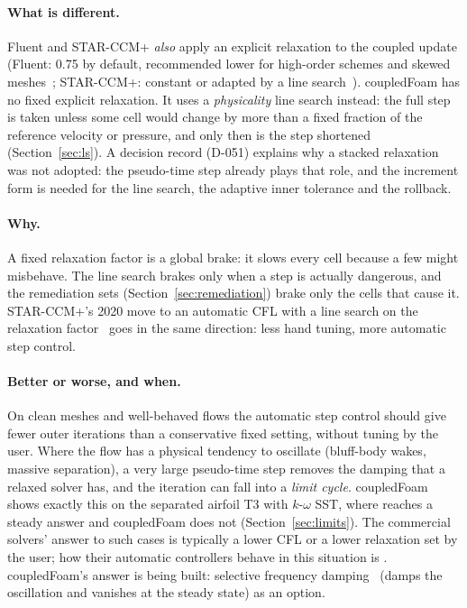 \paragraph{What is different.} Fluent and STAR-CCM+ \emph{also} apply an
explicit relaxation to the coupled update (Fluent: 0.75 by default,
recommended lower for high-order schemes and skewed
meshes~\cite{cmp-Fluent12UG}; STAR-CCM+: constant or adapted by a line
search~\cite{cmp-StarAutoCFL2020}). coupledFoam has no fixed explicit
relaxation. It uses a \emph{physicality} line search instead: the full step
is taken unless some cell would change by more than a fixed fraction of the
reference velocity or pressure, and only then is the step shortened
(Section~\ref{sec:ls}). A decision record (D-051) explains why a stacked
relaxation was not adopted: the pseudo-time step already plays that role,
and the increment form is needed for the line search, the adaptive inner
tolerance and the rollback.

\paragraph{Why.} A fixed relaxation factor is a global brake: it slows
every cell because a few might misbehave. The line search brakes only when
a step is actually dangerous, and the remediation sets
(Section~\ref{sec:remediation}) brake only the cells that cause it. STAR-CCM+'s
2020 move to an automatic CFL with a line search on the relaxation
factor~\cite{cmp-StarAutoCFL2020} goes in the same direction: less hand
tuning, more automatic step control.

\paragraph{Better or worse, and when.} On clean meshes and well-behaved
flows the automatic step control should give fewer outer iterations than a
conservative fixed setting, without tuning by the user. Where the flow has a
physical tendency to oscillate (bluff-body wakes, massive separation), a
very large pseudo-time step removes the damping that a relaxed solver has,
and the iteration can fall into a \emph{limit cycle}. coupledFoam shows
exactly this on the separated airfoil T3 with $k$-$\omega$ SST, where
 reaches a steady answer and coupledFoam does not
(Section~\ref{sec:limits}). The commercial solvers' answer to such cases is
typically a lower CFL or a lower relaxation set by the user; how their
automatic controllers behave in this situation is \cmpnpd. coupledFoam's
answer is being built: selective frequency damping~\cite{cmp-Akervik2006}
(damps the oscillation and vanishes at the steady state) as an option.

